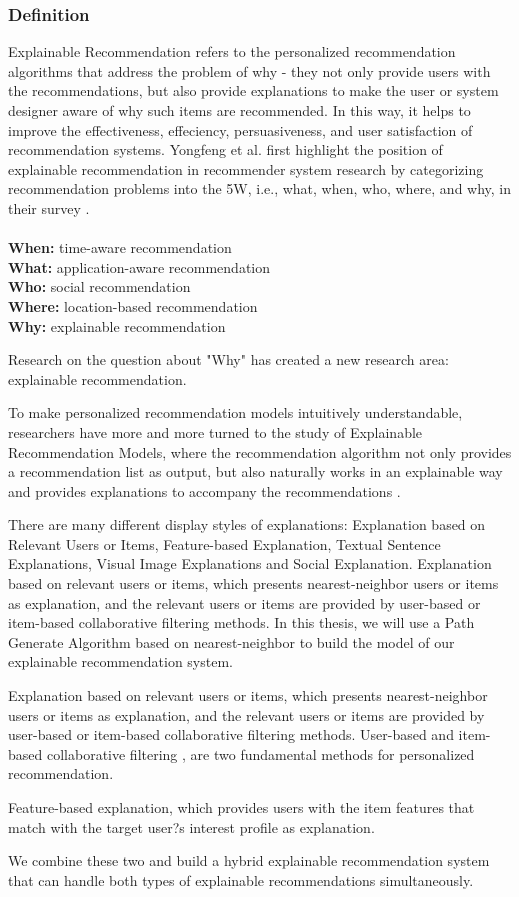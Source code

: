 \subsubsection{Definition}
Explainable Recommendation refers to the personalized recommendation algorithms that address the problem of why - they not only provide users with the recommendations, but also provide explanations to make the user or system designer aware of why such items are recommended. In this way, it helps to improve the effectiveness, effeciency, persuasiveness, and user satisfaction of recommendation systems. Yongfeng et al. first highlight the position of explainable recommendation in recommender system research by categorizing recommendation problems into the 5W, i.e., what, when, who, where, and why, in their survey \cite{zhang2018explainable}. 
\\
\\
\textbf{When:} time-aware recommendation \\
\textbf{What:} application-aware recommendation \\
\textbf{Who:} social recommendation \\
\textbf{Where:} location-based recommendation \\
\textbf{Why:} explainable recommendation \\
\par Research on the question about "Why" has created a new research area: explainable recommendation.
\par To make personalized recommendation models intuitively understandable, researchers have more and more turned to the study of Explainable Recommendation Models, where the recommendation algorithm not only provides a recommendation list as output, but also naturally works in an explainable way and provides explanations to accompany the recommendations \cite{mcauley2015image}.
\par There are many different display styles of explanations: Explanation based on Relevant Users or Items, Feature-based Explanation, Textual Sentence Explanations, Visual Image Explanations and Social Explanation. Explanation based on relevant users or items, which presents nearest-neighbor users or items as explanation, and the relevant users or items are provided by user-based or item-based collaborative filtering methods. In this thesis, we will use a Path Generate Algorithm based on nearest-neighbor to build the model of our explainable recommendation system.
\par Explanation based on relevant users or items, which presents nearest-neighbor users or items as explanation, and the relevant users or items are provided by user-based or item-based collaborative filtering methods. User-based and item-based collaborative filtering \cite{sarwar2001item}, \cite{cleger2012top} are two fundamental methods for personalized recommendation.
\par Feature-based explanation, which provides users with the item features that match with the target user?s interest profile as explanation.
\par We combine these two and build a hybrid explainable recommendation system that can handle both types of explainable recommendations simultaneously.


